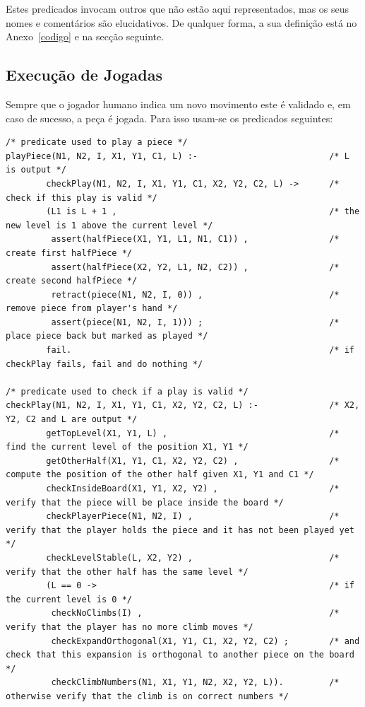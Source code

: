\documentclass[a4paper]{article}
\begin{document}
Estes predicados invocam outros que não estão aqui representados, mas os seus nomes e comentários são elucidativos. De qualquer forma, a sua definição está no Anexo~\ref{codigo} e na secção seguinte.

\subsection{Execução de Jogadas} 

Sempre que o jogador humano indica um novo movimento este é validado e, em caso de sucesso, a peça é jogada. Para isso usam-se os predicados seguintes:

\begin{lstlisting}
/* predicate used to play a piece */
playPiece(N1, N2, I, X1, Y1, C1, L) :-                          /* L is output */
        checkPlay(N1, N2, I, X1, Y1, C1, X2, Y2, C2, L) ->      /* check if this play is valid */
        (L1 is L + 1 ,                                          /* the new level is 1 above the current level */
         assert(halfPiece(X1, Y1, L1, N1, C1)) ,                /* create first halfPiece */
         assert(halfPiece(X2, Y2, L1, N2, C2)) ,                /* create second halfPiece */
         retract(piece(N1, N2, I, 0)) ,                         /* remove piece from player's hand */
         assert(piece(N1, N2, I, 1))) ;                         /* place piece back but marked as played */
        fail.                                                   /* if checkPlay fails, fail and do nothing */

/* predicate used to check if a play is valid */
checkPlay(N1, N2, I, X1, Y1, C1, X2, Y2, C2, L) :-              /* X2, Y2, C2 and L are output */
        getTopLevel(X1, Y1, L) ,                                /* find the current level of the position X1, Y1 */
        getOtherHalf(X1, Y1, C1, X2, Y2, C2) ,                  /* compute the position of the other half given X1, Y1 and C1 */
        checkInsideBoard(X1, Y1, X2, Y2) ,                      /* verify that the piece will be place inside the board */
        checkPlayerPiece(N1, N2, I) ,                           /* verify that the player holds the piece and it has not been played yet */
        checkLevelStable(L, X2, Y2) ,                           /* verify that the other half has the same level */
        (L == 0 ->                                              /* if the current level is 0 */
         checkNoClimbs(I) ,                                     /* verify that the player has no more climb moves */
         checkExpandOrthogonal(X1, Y1, C1, X2, Y2, C2) ;        /* and check that this expansion is orthogonal to another piece on the board */
         checkClimbNumbers(N1, X1, Y1, N2, X2, Y2, L)).         /* otherwise verify that the climb is on correct numbers */


\end{lstlisting}
\end{document}
